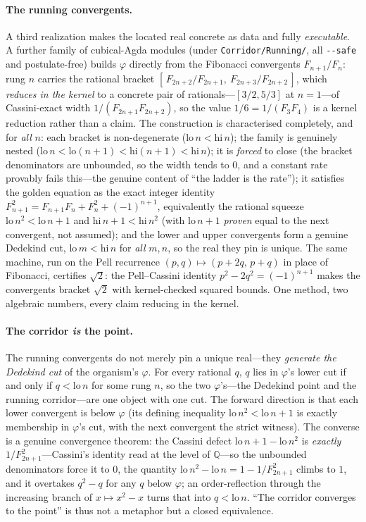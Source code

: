 \documentclass[11pt,letterpaper]{article}
\theoremstyle{plain}
\theoremstyle{definition}
\theoremstyle{remark}
\newcommand{\QQ}{\mathbb{Q}}
\begin{document}
\paragraph{The running convergents.}
A third realization makes the located real concrete as data and fully
\emph{executable}. A further family of cubical-Agda modules (under
\texttt{Corridor/Running/}, all \texttt{-{}-safe} and postulate-free) builds
$\varphi$ directly from the Fibonacci convergents $F_{n+1}/F_n$: rung $n$ carries
the rational bracket $[\,F_{2n+2}/F_{2n+1},\ F_{2n+3}/F_{2n+2}\,]$, which
\emph{reduces in the kernel} to a concrete pair of rationals---$[3/2,5/3]$ at
$n=1$---of Cassini-exact width $1/(F_{2n+1}F_{2n+2})$, so the value $1/6=1/(F_3F_4)$
is a kernel reduction rather than a claim. The construction is characterised
completely, and for \emph{all} $n$: each bracket is non-degenerate
($\mathrm{lo}\,n<\mathrm{hi}\,n$); the family is genuinely nested
($\mathrm{lo}\,n<\mathrm{lo}(n{+}1)<\mathrm{hi}(n{+}1)<\mathrm{hi}\,n$); it is
\emph{forced} to close (the bracket denominators are unbounded, so the width tends
to $0$, and a constant rate provably fails this---the genuine content of ``the
ladder is the rate''); it satisfies the golden equation as the exact integer
identity $F_{n+1}^2 = F_{n+1}F_n + F_n^2 + (-1)^{n+1}$, equivalently the rational
squeeze $\mathrm{lo}\,n^2<\mathrm{lo}\,n+1$ and $\mathrm{hi}\,n+1<\mathrm{hi}\,n^2$
(with $\mathrm{lo}\,n+1$ \emph{proven} equal to the next convergent, not assumed);
and the lower and upper convergents form a genuine Dedekind cut,
$\mathrm{lo}\,m<\mathrm{hi}\,n$ for \emph{all} $m,n$, so the real they pin is
unique. The same machine, run on the Pell recurrence $(p,q)\mapsto(p+2q,\,p+q)$ in
place of Fibonacci, certifies $\sqrt2$: the Pell--Cassini identity
$p^2-2q^2=(-1)^{n+1}$ makes the convergents bracket $\sqrt2$ with kernel-checked
squared bounds. One method, two algebraic numbers, every claim reducing in the
kernel.

\paragraph{The corridor \emph{is} the point.}
The running convergents do not merely pin a unique real---they \emph{generate the
Dedekind cut} of the organism's $\varphi$. For every rational $q$, $q$ lies in
$\varphi$'s lower cut if and only if $q<\mathrm{lo}\,n$ for some rung $n$, so the two
$\varphi$'s---the Dedekind point and the running corridor---are one object with one
cut. The forward direction is that each lower convergent is below $\varphi$ (its
defining inequality $\mathrm{lo}\,n^2<\mathrm{lo}\,n+1$ is exactly membership in
$\varphi$'s cut, with the next convergent the strict witness). The converse is a
genuine convergence theorem: the Cassini defect $\mathrm{lo}\,n+1-\mathrm{lo}\,n^2$
is \emph{exactly} $1/F_{2n+1}^2$---Cassini's identity read at the level of
$\QQ$---so the unbounded denominators force it to $0$, the quantity
$\mathrm{lo}\,n^2-\mathrm{lo}\,n = 1-1/F_{2n+1}^2$ climbs to $1$, and it overtakes
$q^2-q$ for any $q$ below $\varphi$; an order-reflection through the increasing
branch of $x\mapsto x^2-x$ turns that into $q<\mathrm{lo}\,n$. ``The corridor
converges to the point'' is thus not a metaphor but a closed equivalence.
\end{document}
